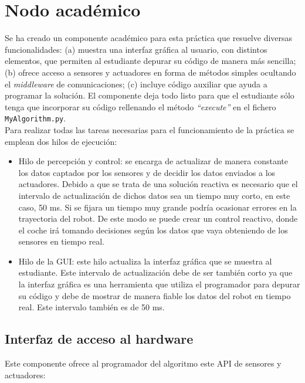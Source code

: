 \section{Nodo académico}
Se ha creado un componente académico para esta práctica que resuelve diversas funcionalidades: (a) muestra una interfaz gráfica al usuario, con distintos elementos, que permiten al estudiante depurar su código de manera más sencilla; (b) ofrece acceso a sensores y actuadores en forma de métodos simples ocultando el \textit{middleware} de comunicaciones; (c) incluye código auxiliar que ayuda a programar la solución. El componente deja todo listo para que el estudiante sólo tenga que incorporar su código rellenando el método \textit{``execute''} en el fichero \texttt{MyAlgorithm.py}.\\

Para realizar todas las tareas necesarias para el funcionamiento de la práctica se emplean dos hilos de ejecución:

\begin{itemize}
\item	Hilo de percepción y control: se encarga de actualizar de manera constante los datos captados por los sensores y de decidir los datos enviados a los actuadores. Debido a que se trata de una solución reactiva es necesario que el intervalo de actualización de dichos datos sea un tiempo muy corto, en este caso, 50 ms. Si se fijara un tiempo muy grande podría ocasionar errores en la trayectoria del robot. De este modo se puede crear un control reactivo, donde el coche irá tomando decisiones según los datos que vaya obteniendo de los sensores en tiempo real.

\item	Hilo de la GUI: este hilo actualiza la interfaz gráfica que se muestra al estudiante. Este intervalo de actualización debe de ser también corto ya que la interfaz gráfica es una herramienta que utiliza el programador para depurar su código y debe de mostrar de manera fiable los datos del robot en tiempo real. Este intervalo también es de 50 ms.
\end{itemize}

\subsection{Interfaz de acceso al hardware}
Este componente ofrece al programador del algoritmo este API de sensores y actuadores:

